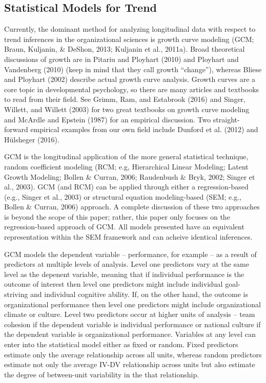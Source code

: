 \documentclass[english,,man]{apa6}
\theoremstyle{definition}
\theoremstyle{definition}
\theoremstyle{definition}
\theoremstyle{remark}
\begin{document}
\hypertarget{statistical-models-for-trend}{%
\subsection{Statistical Models for
Trend}\label{statistical-models-for-trend}}

Currently, the dominant method for analyzing longitudinal data with
respect to trend inferences in the organizational sciences is growth
curve modeling (GCM; Braun, Kuljanin, \& DeShon, 2013; Kuljanin et al.,
2011a). Broad theoretical discussions of growth are in Pitariu and
Ployhart (2010) and Ployhart and Vandenberg (2010) (keep in mind that
they call growth \enquote{change}), whereas Bliese and Ployhart (2002)
describe actual growth curve analysis. Growth curves are a core topic in
developmental psychology, so there are many articles and textbooks to
read from their field. See Grimm, Ram, and Estabrook (2016) and Singer,
Willett, and Willett (2003) for two great textbooks on growth curve
modeling and McArdle and Epstein (1987) for an empirical discussion. Two
straight-forward empirical examples from our own field include Dunford
et al. (2012) and Hülsheger (2016).

GCM is the longitudinal application of the more general statistical
technique, random coefficient modeling (RCM; e.g, Hierarchical Linear
Modeling; Latent Growth Modeling; Bollen \& Curran, 2006; Raudenbush \&
Bryk, 2002; Singer et al., 2003). GCM (and RCM) can be applied through
either a regression-based (e.g., Singer et al., 2003) or structural
equation modeling-based (SEM; e.g., Bollen \& Curran, 2006) approach. A
complete discussion of these two approaches is beyond the scope of this
paper; rather, this paper only focuses on the regression-based approach
of GCM. All models presented have an equivalent representation within
the SEM framework and can acheive identical inferences.

GCM models the dependent variable -- performance, for example -- as a
result of predictors at multiple levels of analysis. Level one
predictors vary at the same level as the depenent variable, meaning that
if individual performance is the outcome of interest then level one
predictors might include individual goal-striving and individual
cognitive ability. If, on the other hand, the outcome is organizational
performance then level one predictors might include organizational
climate or culture. Level two predictors occur at higher units of
analysis -- team cohesion if the dependent variable is individual
performance or national culture if the dependent variable is
organizational performance. Variables at any level can enter into the
statistical model either as fixed or random. Fixed predictors estimate
only the average relationship across all units, whereas random
predictors estimate not only the average IV-DV relationship across units
but also estimate the degree of between-unit variability in the that
relationship.
\end{document}
